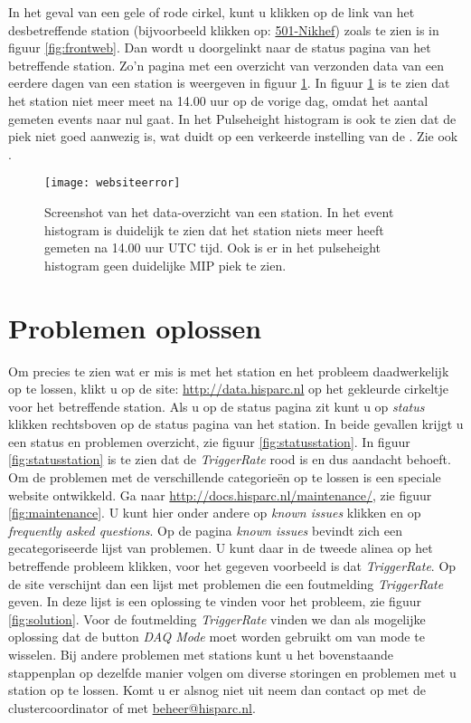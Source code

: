 In het geval van een gele of rode cirkel, kunt u klikken op de link van het
desbetreffende station (bijvoorbeeld klikken op: \underline{501-Nikhef}) zoals te zien is in figuur \ref{fig:frontweb}. 
Dan wordt u doorgelinkt naar de status pagina van het betreffende station. Zo'n
pagina met een overzicht van verzonden data van een eerdere dagen
van een station is weergeven in figuur \ref{fig:websiteerror}. In figuur \ref{fig:websiteerror}
is te zien dat het station niet meer meet na 14.00 uur op de vorige dag,  omdat het aantal
gemeten events naar nul gaat. In het Pulseheight histogram is ook te zien
dat de \mip piek niet goed aanwezig is, wat duidt op een verkeerde
instelling van de \pmt. Zie ook \cite{inregelen}.

\begin{figure} 
\centering 
\texttt{[image: websiteerror]}
\caption{Screenshot van het data-overzicht van een
station. In het event histogram is duidelijk te zien dat het station
niets meer heeft gemeten na 14.00 uur UTC tijd. Ook is er in het pulseheight histogram
geen duidelijke MIP piek te zien.} \label{fig:websiteerror} 
\end{figure}

\section{Problemen oplossen}

Om precies te zien wat er mis is met het station en het probleem
daadwerkelijk op te lossen, klikt u op de site: \url{http://data.hisparc.nl} op het gekleurde cirkeltje voor het betreffende station. Als u op de status pagina zit kunt u op \emph{status} klikken rechtsboven op de status pagina van het station.
In beide gevallen krijgt u een status en problemen overzicht, zie figuur \ref{fig:statusstation}. 
In figuur \ref{fig:statusstation} is te zien dat de \emph{TriggerRate}
rood is en dus aandacht behoeft.
Om de problemen met de verschillende categorieën op te lossen is een speciale website ontwikkeld.
Ga naar \url{http://docs.hisparc.nl/maintenance/}, zie figuur \ref{fig:maintenance}. 
U kunt hier onder andere op \emph{known issues} klikken en op \emph{frequently asked questions}. 
Op de pagina \emph{known issues} bevindt zich een gecategoriseerde lijst van problemen. 
U kunt daar in de tweede alinea op het betreffende probleem klikken, voor het gegeven voorbeeld is dat \emph{TriggerRate}. 
Op de site verschijnt dan een lijst met problemen die een foutmelding \emph{TriggerRate} geven. 
In deze lijst is een oplossing te vinden voor het probleem, zie figuur \ref{fig:solution}.
Voor de foutmelding \emph{TriggerRate} vinden we dan als mogelijke oplossing dat de button \emph{DAQ Mode} moet worden gebruikt om van mode te wisselen.
Bij andere problemen met stations kunt u het bovenstaande stappenplan op dezelfde manier volgen om diverse storingen en problemen met u station op te lossen.
Komt u er alsnog niet uit neem dan contact op met de clustercoordinator of met \url{beheer@hisparc.nl}.
 

